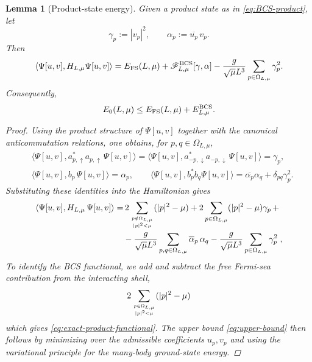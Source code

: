 \documentclass[11pt]{amsart}
\newtheorem{lemma}[definition]{Lemma}
\theoremstyle{definition}
\numberwithin{equation}{section}
\newcommand{\1}{\mathbf 1}
\begin{document}
\begin{lemma}[Product-state energy]
\label{lem:product-energy}
Given a product state as in \eqref{eq:BCS-product}, let
\begin{equation}\label{eq:product-gamma-alpha}
 \gamma_p :=|v_p|^2,\qquad
 \alpha_p :=\overline{u_p}\,v_p.
\end{equation}
Then
\begin{equation}\label{eq:exact-product-functional}
 \langle\Psi[u,v],H_{L,\mu}\Psi[u,v]\rangle
 =
 E_{\rm FS}(L,\mu)
 +\mathscr F^{\rm BCS}_{L,\mu}[\gamma,\alpha]
 -\frac{g}{\sqrt{\mu}L^3}\sum_{p\in\Omega_{L,\mu}}\gamma_p^2.
\end{equation}
Consequently,
\begin{equation}\label{eq:upper-bound}
 E_0(L,\mu) \le E_{\rm FS}(L,\mu) + E^{\rm BCS}_{L,\mu}.
\end{equation}


\begin{proof}
Using the product structure of $\Psi[u,v]$ together with the canonical anticommutation relations, one obtains, for $p,q\in\Omega_{L,\mu}$,
\begin{align*}
 &\langle \Psi[u,v], a^*_{p,\uparrow}a_{p,\uparrow}\, \Psi[u,v]\rangle
 =\langle \Psi[u,v], a^*_{-p,\downarrow}a_{-p,\downarrow}\, \Psi[u,v]\rangle =\gamma_p, \nonumber\\
 &\langle \Psi[u,v], b_p\, \Psi[u,v]\rangle = \alpha_p, \qquad \langle \Psi[u,v], b_p^*b_q \Psi[u,v]\rangle
 =\overline{\alpha_p}\alpha_q
 +\delta_{pq}\gamma_p^2.
\end{align*}
Substituting these identities into the Hamiltonian gives
\begin{align*}
    \langle \Psi[u,v], H_{L, \mu}\, \Psi[u,v]\rangle =&\, 2\sum_{p \notin \Omega_{L, \mu}\atop |p|^2 < \mu}(|p|^2 - \mu) + 2\sum_{p \in \Omega_{L, \mu}}(|p|^2 - \mu)\gamma_p\, + \\
    & -\frac{g}{\sqrt{\mu}L^3}\sum_{p,q \in \Omega_{L, \mu}}\overline{\alpha}_p\,\alpha_q - \frac{g}{\sqrt{\mu}L^3}\sum_{p \in \Omega_{L, \mu}}\gamma_p^2\;,
\end{align*}
To identify the BCS functional, we add and subtract the free Fermi-sea contribution from the interacting shell,
\begin{equation*}
    2\sum_{p \in \Omega_{L, \mu} \atop |p|^2 < \mu}(|p|^2 - \mu)
\end{equation*}
which gives \eqref{eq:exact-product-functional}. The upper bound \eqref{eq:upper-bound} then follows by minimizing over the admissible coefficients $u_p,v_p$ and using the variational principle for the many-body ground-state energy.
\end{proof}
\end{lemma}
\end{document}

